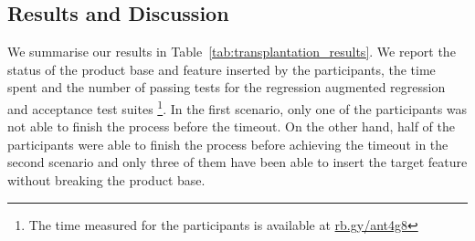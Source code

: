 \subsection{Results and Discussion}
\label{sec:evaluation_results}

We summarise our results in Table~\ref{tab:transplantation_results}.  
We report the status of the product base and feature inserted by the participants, the time spent and the number of passing tests for the regression augmented regression and acceptance test suites \footnote{The time measured for the participants is available at \url{rb.gy/ant4g8}}. 
In the first scenario, only one of the participants was not able to finish the process before the timeout. On the other hand, half of the participants were able to finish the process before achieving the timeout in the second scenario and only three of them have been able to insert the target feature without breaking the product base. 

